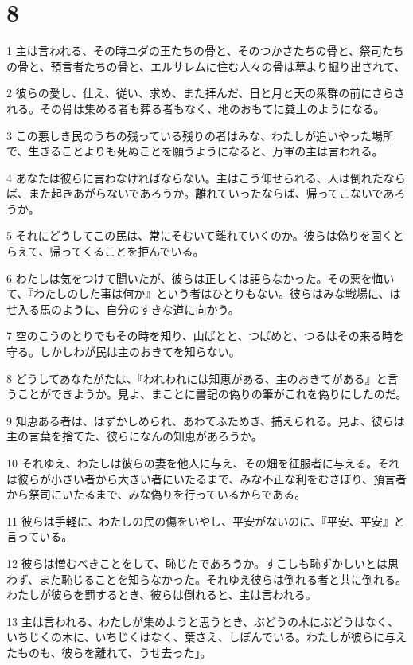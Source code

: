 \chapter{8}

\par 1 主は言われる、その時ユダの王たちの骨と、そのつかさたちの骨と、祭司たちの骨と、預言者たちの骨と、エルサレムに住む人々の骨は墓より掘り出されて、
\par 2 彼らの愛し、仕え、従い、求め、また拝んだ、日と月と天の衆群の前にさらされる。その骨は集める者も葬る者もなく、地のおもてに糞土のようになる。
\par 3 この悪しき民のうちの残っている残りの者はみな、わたしが追いやった場所で、生きることよりも死ぬことを願うようになると、万軍の主は言われる。
\par 4 あなたは彼らに言わなければならない。主はこう仰せられる、人は倒れたならば、また起きあがらないであろうか。離れていったならば、帰ってこないであろうか。
\par 5 それにどうしてこの民は、常にそむいて離れていくのか。彼らは偽りを固くとらえて、帰ってくることを拒んでいる。
\par 6 わたしは気をつけて聞いたが、彼らは正しくは語らなかった。その悪を悔いて、『わたしのした事は何か』という者はひとりもない。彼らはみな戦場に、はせ入る馬のように、自分のすきな道に向かう。
\par 7 空のこうのとりでもその時を知り、山ばとと、つばめと、つるはその来る時を守る。しかしわが民は主のおきてを知らない。
\par 8 どうしてあなたがたは、『われわれには知恵がある、主のおきてがある』と言うことができようか。見よ、まことに書記の偽りの筆がこれを偽りにしたのだ。
\par 9 知恵ある者は、はずかしめられ、あわてふためき、捕えられる。見よ、彼らは主の言葉を捨てた、彼らになんの知恵があろうか。
\par 10 それゆえ、わたしは彼らの妻を他人に与え、その畑を征服者に与える。それは彼らが小さい者から大きい者にいたるまで、みな不正な利をむさぼり、預言者から祭司にいたるまで、みな偽りを行っているからである。
\par 11 彼らは手軽に、わたしの民の傷をいやし、平安がないのに、『平安、平安』と言っている。
\par 12 彼らは憎むべきことをして、恥じたであろうか。すこしも恥ずかしいとは思わず、また恥じることを知らなかった。それゆえ彼らは倒れる者と共に倒れる。わたしが彼らを罰するとき、彼らは倒れると、主は言われる。
\par 13 主は言われる、わたしが集めようと思うとき、ぶどうの木にぶどうはなく、いちじくの木に、いちじくはなく、葉さえ、しぼんでいる。わたしが彼らに与えたものも、彼らを離れて、うせ去った」。
